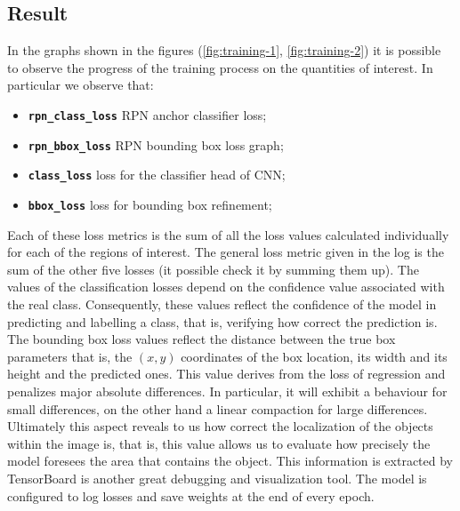 \subsection{Result}
\label{ssec:result}
%
In the graphs shown in the figures (\ref{fig:training-1}, \ref{fig:training-2}) it is
possible to observe the progress of the training process on the quantities of
interest. In particular we observe that:
\begin{itemize}
	\item \textbf{\texttt{rpn\_class\_loss}} RPN anchor classifier loss;
	\item \textbf{\texttt{rpn\_bbox\_loss}} RPN bounding box loss graph;
	\item \textbf{\texttt{class\_loss}} loss for the classifier head of CNN;
	\item \textbf{\texttt{bbox\_loss}} loss for bounding box refinement;
\end{itemize}
Each of these loss metrics is the sum of all the loss values calculated
individually for each of the regions of interest.
The general loss metric given in the log is the sum of the other five losses
(it possible check it by summing them up).
The values of the classification losses depend on the confidence value
associated with the real class. 
Consequently, these values reflect the confidence of the model in predicting and
labelling a class, that is, verifying how correct the prediction is.\\
The bounding box loss values reflect the distance between the true box
parameters that is, the $(x, y)$ coordinates of the box location, its width and
its height and the predicted ones.
This value derives from the loss of regression and penalizes major absolute
differences. 
In particular, it will exhibit a behaviour for small differences, on the other
hand a linear compaction for large differences. Ultimately this aspect reveals
to us how correct the localization of the objects within the image is, that is,
this value allows us to evaluate how precisely the model foresees the area that
contains the object.
This information is extracted by TensorBoard is another great debugging and
visualization tool. 
The model is configured to log losses and save weights at the end of every
epoch.\cite{matterport_maskrcnn_2017}
%
